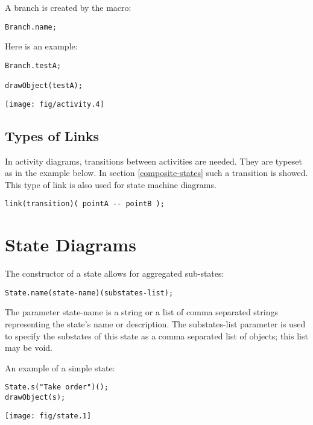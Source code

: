 \documentclass{article}
\newcommand{\code}{\ttfamily}
\begin{document}
A branch is created by the macro:

\begin{verbatim}
Branch.name;
\end{verbatim}

Here is an example:

\begin{multicols}{2}
\begin{verbatim}
Branch.testA;

drawObject(testA);
\end{verbatim}
\columnbreak
\hspace{1cm}\texttt{[image: fig/activity.4]}
\end{multicols}


\subsection{Types of Links}

In activity diagrams, transitions between activities are needed. They are typeset
as in the example below. In section \ref{composite-states} such a transition
is showed. This type of link is also used for state machine diagrams.

\begin{verbatim}
link(transition)( pointA -- pointB );
\end{verbatim}

\section{State Diagrams}

The constructor of a state allows for aggregated sub-states:

\begin{verbatim}
State.name(state-name)(substates-list);
\end{verbatim}

The parameter {\code state-name} is a string or a list of comma separated strings representing
the state's name or description. The {\code substates-list} parameter is used to specify
the substates of this state as a comma separated list of objects; this list may be void.

An example of a simple state:

\begin{multicols}{2}
\begin{verbatim}
State.s("Take order")();
drawObject(s);
\end{verbatim}
\columnbreak
\hspace{1cm}\texttt{[image: fig/state.1]}
\end{multicols}
\end{document}
